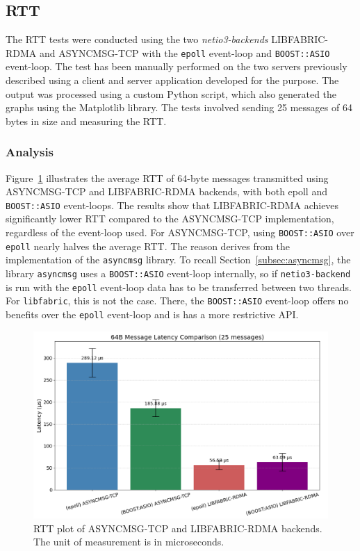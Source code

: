 \subsection{\acf{RTT}}

The \acl{RTT} tests were conducted using the two \textit{netio3-backends} LIBFABRIC-RDMA and ASYNCMSG-TCP with the \texttt{epoll} event-loop and \texttt{BOOST::ASIO} event-loop. The test has been manually performed on the two servers previously described using a client and server application developed for the purpose. The output was processed using a custom Python script, which also generated the graphs using the Matplotlib \cite{matplotlib} library. The tests involved sending 25 messages of 64 bytes in size and measuring the \acl{RTT}.

\subsubsection{Analysis}

Figure~\ref{fig:rtt-tcp-rdma} illustrates the average \acs{RTT} of 64-byte messages transmitted using\\ ASYNCMSG-TCP and LIBFABRIC-RDMA backends, with both epoll and \texttt{BOOST::ASIO} event-loops. The results show that LIBFABRIC-RDMA achieves significantly lower \acs{RTT} compared to the ASYNCMSG-TCP implementation, regardless of the event-loop used. For ASYNCMSG-TCP, using \texttt{BOOST::ASIO} over \texttt{epoll} nearly halves the average \acs{RTT}. The reason derives from the implementation of the \texttt{asyncmsg} library. To recall Section~\ref{subsec:asyncmsg}, the library \texttt{asyncmsg} uses a \texttt{BOOST::ASIO} event-loop internally, so if \texttt{netio3-backend} is run with the \texttt{epoll} event-loop data has to be transferred between two threads. For \texttt{libfabric}, this is not the case. There, the \texttt{BOOST::ASIO} event-loop offers no benefits over the \texttt{epoll} event-loop and is has a more restrictive \acs{API}.

\begin{figure}[htbp]
\centering
\includegraphics[width=\textwidth]{images/results/rtt.png}
\caption[RTT plot]{RTT plot of ASYNCMSG-TCP and LIBFABRIC-RDMA backends. The unit of measurement is in microseconds.}
\label{fig:rtt-tcp-rdma}
\end{figure}

